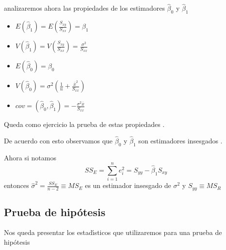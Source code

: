 analizaremos ahora las propiedades de los estimadores $\hat{\beta}_{0}$ y
$\hat{\beta}_{1}$

\begin{itemize}
\item $E\left(  \hat{\beta}_{1}\right)  =E\left(  \frac{S_{xy}}{S_{xx}%
}\right)  =\beta_{1}$

\item $V\left(  \hat{\beta}_{1}\right)  =V\left(  \frac{S_{xy}}{S_{xx}%
}\right)  =\frac{\sigma^{2}}{S_{xx}}$

\item $E\left(  \hat{\beta}_{0}\right)  =\beta_{0}$

\item $V\left(  \hat{\beta}_{0}\right)  =\sigma^{2}\left(  \frac{1}{n}%
+\frac{\bar{x}^{2}}{S_{xx}}\right)  $

\item $cov=\left(  \hat{\beta}_{0},\hat{\beta}_{1}\right)  =-\frac{\sigma
^{2}\bar{x}}{S_{xx}}$
\end{itemize}

Queda como ejercicio la prueba de estas propiedades .

De acuerdo con esto observamos que $\hat{\beta}_{0}$ y $\hat{\beta}_{1}$ son
estimadores insesgados .

Ahora si notamos
\[
SS_{E}=\sum_{i=1}^{n}e_{i}^{2}=S_{yy}-\hat{\beta}_{1}S_{xy}%
\]
entonces $\hat{\sigma}^{2}=\frac{SS_{E}}{n-2}\equiv MS_{E}$ es un estimador
insesgado de $\sigma^{2}$ y $S_{yy}\equiv MS_{R}$

\subsection{Prueba de hip\'{o}tesis}

Nos queda presentar los estad\'{\i}sticos que utilizaremos para una prueba de hip\'{o}tesis

